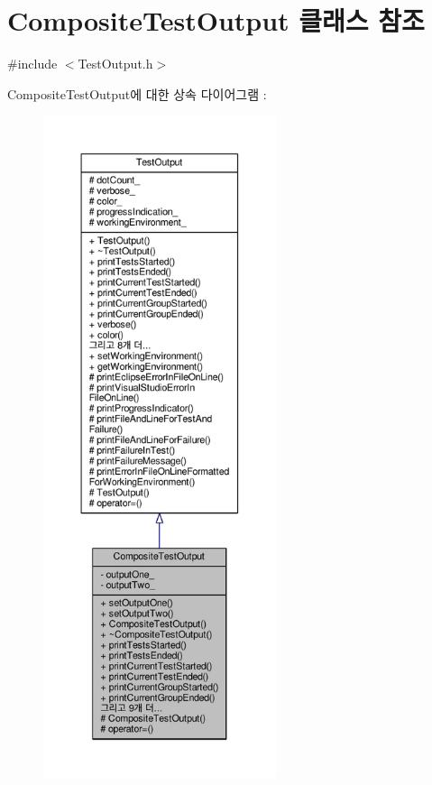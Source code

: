 \hypertarget{class_composite_test_output}{}\section{Composite\+Test\+Output 클래스 참조}
\label{class_composite_test_output}


{\ttfamily \#include $<$Test\+Output.\+h$>$}



Composite\+Test\+Output에 대한 상속 다이어그램 \+: 
\nopagebreak
\begin{figure}[H]
\begin{center}
\leavevmode
\includegraphics[height=550pt]{class_composite_test_output__inherit__graph}
\end{center}
\end{figure}


